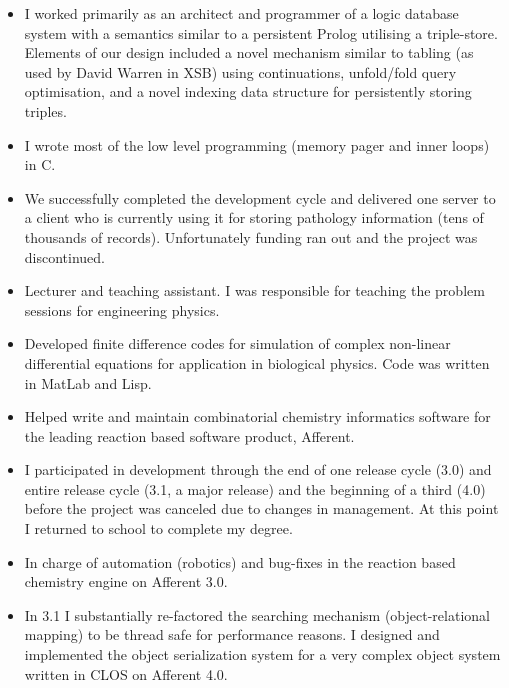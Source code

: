 \documentclass[a4paper,11pt]{moderncv}
\begin{document}
{
  \begin{itemize}
  \item I worked primarily as an architect and programmer of a logic database system with a semantics similar to a persistent Prolog utilising a triple-store. Elements of our design included a novel mechanism similar to tabling (as used by David Warren in XSB) using continuations, unfold/fold query optimisation, and a novel indexing data structure for persistently storing triples.
  \item I wrote most of the low level programming (memory pager and inner loops) in C.
  \item We successfully completed the development cycle and delivered one server to a client who is currently using it for storing pathology information (tens of thousands of records). Unfortunately funding ran out and the project was discontinued.
  \end{itemize}
}

{
  \begin{itemize}
  \item Lecturer and teaching assistant. I was responsible for teaching the problem sessions for engineering physics.
  \end{itemize}
}

{
  \begin{itemize}
  \item Developed finite difference codes for simulation of complex non-linear differential equations for application in biological physics. Code was written in MatLab and Lisp.
  \end{itemize}
}

{
  \begin{itemize}
  \item Helped write and maintain combinatorial chemistry informatics software for the leading reaction based software product, Afferent.
  \item I participated in development through the end of one release cycle (3.0) and entire release cycle (3.1, a major release) and the beginning of a third (4.0) before the project was canceled due to changes in management. At this point I returned to school to complete my degree.
  \item In charge of automation (robotics) and bug-fixes in the reaction based chemistry engine on Afferent 3.0.
  \item In 3.1 I substantially re-factored the searching mechanism (object-relational mapping) to be thread safe for performance reasons. I designed and implemented the object serialization system for a very complex object system written in CLOS on Afferent 4.0.
  \end{itemize}
}
\end{document}
